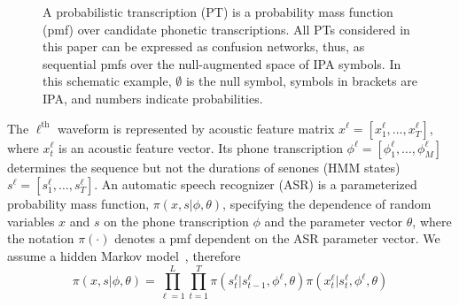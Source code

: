 \begin{figure}
\begin{center}
\end{center}
\caption{A probabilistic transcription (PT) is a probability mass
  function (pmf) over candidate phonetic transcriptions.  All PTs
  considered in this paper can be expressed as confusion networks,
  thus, as sequential pmfs over the null-augmented space of IPA
  symbols.  In this schematic example, $\emptyset$ is the null
  symbol, symbols in brackets are IPA, and numbers indicate
  probabilities.}
  \label{fig:pt}
\end{figure}

The $\ell^{\textrm{th}}$ waveform is represented by acoustic feature
matrix $x^\ell =[x_1^\ell,\ldots,x_T^\ell]$, where $x_t^\ell$ is an
acoustic feature vector.  Its phone transcription
$\phi^\ell=[\phi_1^\ell,\ldots,\phi_M^\ell]$ determines the sequence
but not the durations of senones (HMM states) $s^\ell
=[s_1^\ell,\ldots,s_T^\ell]$.  An automatic speech recognizer (ASR) is
a parameterized probability mass function, $\pi(x,s|\phi,\theta)$,
specifying the dependence of random variables $x$ and $s$ on the phone
transcription $\phi$ and the parameter vector $\theta$, where the
notation $\pi(\cdot)$ denotes a pmf dependent on the ASR parameter
vector.  We assume a hidden Markov model~\cite{Baker75}, therefore
\[
\pi(x,s|\phi,\theta)=\prod_{\ell=1}^L \prod_{t=1}^T
\pi(s_t^\ell|s_{t-1}^\ell,\phi^\ell,\theta)\pi(x_t^\ell|s_t^\ell,\phi^\ell,\theta)
\]
